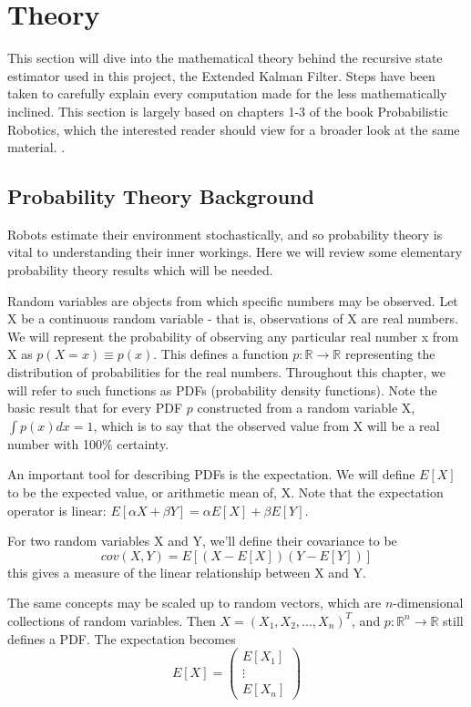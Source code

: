 \chapter{Theory}

This section will dive into the mathematical theory behind the recursive state estimator used in this project, the Extended Kalman Filter. Steps have been taken to carefully explain every computation made for the less mathematically inclined. This section is largely based on chapters 1-3 of the book Probabilistic Robotics, which the interested reader should view for a broader look at the same material. \cite{probabilisticRobotics}.

\section{Probability Theory Background} \label{sectionProbTheory}
Robots estimate their environment stochastically, and so probability theory is vital to understanding their inner workings. Here we will review some elementary probability theory results which will be needed.

Random variables are objects from which specific numbers may be observed. Let X be a continuous random variable - that is, observations of X are real numbers. We will represent the probability of observing any particular real number x from X as \( p(X = x) \equiv p(x)\). This defines a function \(p: \mathbb{R} \to \mathbb{R}\) representing the distribution of probabilities for the real numbers. Throughout this chapter, we will refer to such functions as PDFs (probability density functions). Note the basic result that for every PDF \(p\) constructed from a random variable X, \(\int p(x)dx = 1\), which is to say that the observed value from X will be a real number with 100\% certainty.

An important tool for describing PDFs is the expectation. We will define \(E[X]\) to be the expected value, or arithmetic mean of, X. Note that the expectation operator is linear: \(E[\alpha X + \beta Y] = \alpha E[X] + \beta E[Y]\).

For two random variables X and Y, we'll define their covariance to be
\[
cov(X,Y) = E[(X - E[X])(Y - E[Y])]
\]
this gives a measure of the linear relationship between X and Y.

The same concepts may be scaled up to random vectors, which are \(n\)-dimensional collections of random variables. Then \(X = (X_1,X_2,...,X_n)^T\), and \(p:\mathbb{R}^n \to \mathbb{R}\) still defines a PDF. The expectation becomes \[
E[X] = \begin{pmatrix}
E[X_1] \\
\vdots \\
E[X_n]
\end{pmatrix} 
\]

